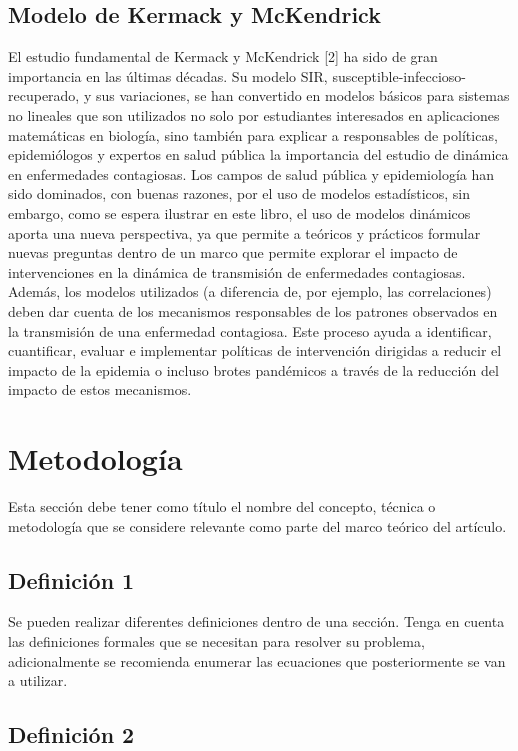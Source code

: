 \documentclass[journal]{IEEEtran}
\begin{document}
\subsection{Modelo de Kermack y McKendrick}

El estudio fundamental de Kermack y McKendrick [2] ha sido de gran importancia en las últimas décadas. Su modelo SIR, susceptible-infeccioso-recuperado, y sus variaciones, 
se han convertido en modelos básicos para sistemas no lineales que son utilizados no solo por estudiantes interesados en aplicaciones matemáticas en biología,
sino también para explicar a responsables de políticas, epidemiólogos y expertos en salud pública la importancia del estudio de dinámica en enfermedades contagiosas.
Los campos de salud pública y epidemiología han sido dominados, con buenas razones, por el uso de modelos estadísticos, sin embargo, como se espera ilustrar en este libro,
el uso de modelos dinámicos aporta una nueva perspectiva, ya que permite a teóricos y prácticos formular nuevas preguntas dentro de un marco que permite explorar el impacto de intervenciones en la dinámica de transmisión de enfermedades contagiosas. 
Además, los modelos utilizados (a diferencia de, por ejemplo, las correlaciones) deben dar cuenta de los mecanismos responsables de los patrones observados en la transmisión de una enfermedad contagiosa.
Este proceso ayuda a identificar, cuantificar, evaluar e implementar políticas de intervención dirigidas a reducir el impacto de la epidemia o incluso brotes pandémicos a través de la reducción del impacto de estos mecanismos.


\section{Metodología}	
Esta sección debe tener como título el nombre del concepto, técnica o metodología que se considere relevante como parte del marco teórico del artículo.
\subsection{Definición 1}
Se pueden realizar diferentes definiciones dentro de una sección. Tenga en cuenta las definiciones formales que se necesitan para resolver su problema, adicionalmente se recomienda enumerar las ecuaciones que posteriormente se van a utilizar.

\subsection{Definición 2}
\end{document}
